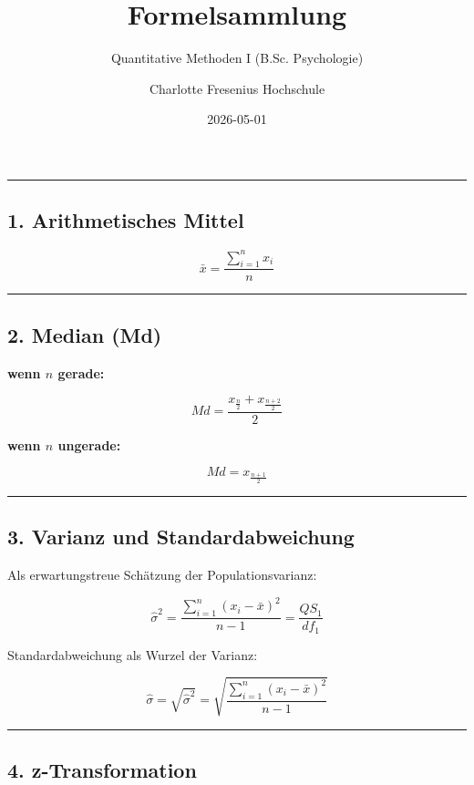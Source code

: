 \documentclass[
]{article}
\title{Formelsammlung}
\subtitle{Quantitative Methoden I (B.Sc. Psychologie)}
\author{Charlotte Fresenius Hochschule}
\date{2026-05-01}
\begin{document}
\maketitle

{
\setcounter{tocdepth}{2}
\tableofcontents
}
\begin{center}\rule{0.5\linewidth}{0.5pt}\end{center}

\subsection{1. Arithmetisches Mittel}\label{arithmetisches-mittel}

\[\bar{x} = \frac{\sum_{i=1}^{n} x_i}{n}\]

\begin{center}\rule{0.5\linewidth}{0.5pt}\end{center}

\subsection{2. Median (Md)}\label{median-md}

\textbf{wenn \(n\) gerade:}

\[Md = \frac{x_{\frac{n}{2}} + x_{\frac{n+2}{2}}}{2}\]

\textbf{wenn \(n\) ungerade:}

\[Md = x_{\frac{n+1}{2}}\]

\begin{center}\rule{0.5\linewidth}{0.5pt}\end{center}

\subsection{3. Varianz und
Standardabweichung}\label{varianz-und-standardabweichung}

Als erwartungstreue Schätzung der Populationsvarianz:

\[\hat{\sigma}^2 = \frac{\sum_{i=1}^{n}(x_i - \bar{x})^2}{n-1} = \frac{QS_1}{df_1}\]

Standardabweichung als Wurzel der Varianz:

\[\hat{\sigma} = \sqrt{\hat{\sigma}^2} = \sqrt{\frac{\sum_{i=1}^{n}(x_i - \bar{x})^2}{n-1}}\]

\begin{center}\rule{0.5\linewidth}{0.5pt}\end{center}

\subsection{4. z-Transformation}\label{z-transformation}
\end{document}
